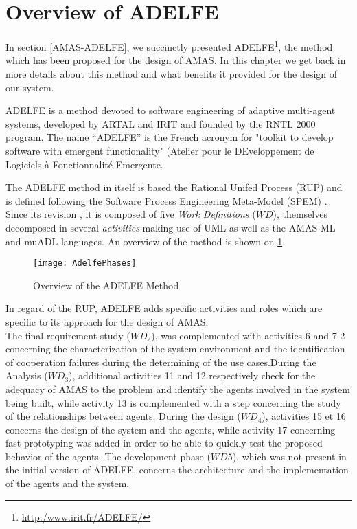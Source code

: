 \section{Overview of ADELFE}

In section \ref{AMAS-ADELFE}, we succinctly presented ADELFE\footnote{\url{http:/www.irit.fr/ADELFE/}}, the method which has been proposed for the design of AMAS. In this chapter we get back in more details about this method and what benefits it provided for the design of our system. 

ADELFE is a method devoted to software engineering of adaptive multi-agent systems, developed by ARTAL and IRIT and founded by the RNTL 2000 program. The name “ADELFE” is the French acronym for "toolkit to develop software with emergent functionality" (Atelier pour le DEveloppement de Logiciels à Fonctionnalité Emergente.

The ADELFE method in itself is based the Rational Unifed Process (RUP) and is defined following the Software Process Engineering Meta-Model (SPEM)  \cite{bernon2003adelfe,picard04phdthesis}. Since its revision \cite{Ro2008.3}, it is composed of five \emph{Work Definitions} ($WD$), themselves decomposed in several \emph{activities} making use of UML as well as the AMAS-ML and muADL languages. An overview of the method is shown on \figurename{} \ref{ADELFE_phases}.

\begin{figure}
\centering
\texttt{[image: AdelfePhases]}
\caption{Overview of the ADELFE Method}\label{ADELFE_phases}
\end{figure}

In regard of the RUP, ADELFE adds specific activities and roles which are specific to its approach for the design of AMAS.\\
The final requirement study ($WD_2$), was complemented with activities 6 and 7-2 concerning the characterization of the system environment and the identification of cooperation failures during the determining of the use cases.During the Analysis ($WD_3$), additional activities 11 and 12 respectively check for the adequacy of AMAS to the problem and identify the agents involved in the system being built, while activity 13 is complemented with a step concerning the study of the relationships between agents. During the design ($WD_4$), activities 15 et 16 concerns the design of the system and the agents, while activity 17 concerning fast prototyping was added in order to be able to quickly test the proposed behavior of the agents. The development phase ($WD5$), which was not present in the initial version of ADELFE, concerns the architecture and the implementation of the agents and the system.

